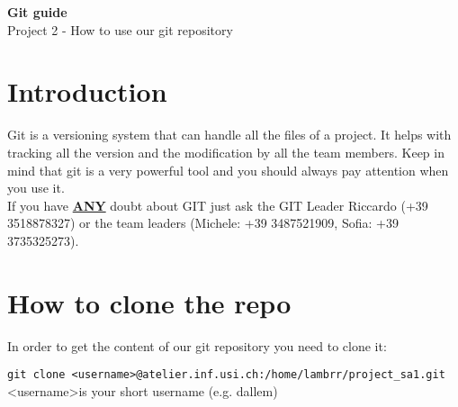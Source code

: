 \documentclass[a4paper,12pt]{article}
\newcommand{\<}{\textless}
\renewcommand{\>}{\textgreater}
\begin{document}
\begin{center}
 \huge{\textbf{Git guide}}\\[.5em]
 \Large{Project 2 - How to use our git repository}
\end{center}
\vspace{3em}
\tableofcontents

\newpage

\section{Introduction}
Git is a versioning system that can handle all the files of a project. It helps with tracking all the version and the modification by all the team members. Keep in mind that git is a very powerful tool and you should always pay attention when you use it.\\[.5em]
If you have \textbf{\underline{ANY}} doubt about GIT just ask the GIT Leader Riccardo (+39 3518878327) or the team leaders (Michele: +39 3487521909, Sofia: +39 3735325273).

\section{How to clone the repo}
In order to get the content of our git repository you need to clone it:
\begin{center}
 \small{\texttt{git clone <username>@atelier.inf.usi.ch:/home/lambrr/project\_sa1.git}}\\[.75em]
 \textless username\textgreater \enspace is your short username (e.g. dallem)
\end{center}
\end{document}
